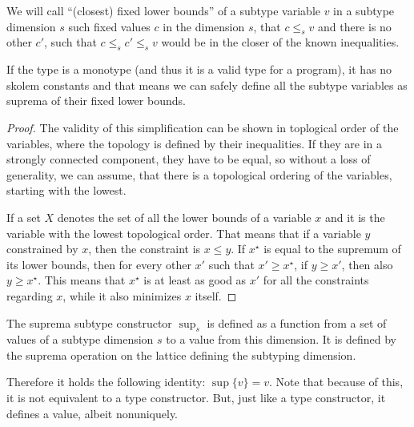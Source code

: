 \begin{defn}
    We will call ``(closest) fixed lower bounds'' of a subtype variable $v$ in a subtype dimension $s$ such fixed values $c$ in the dimension $s$, that $c \leq_s v$ and there is no other $c'$, such that $c \leq_s c' \leq_s v$ would be in the closer of the known inequalities.
\end{defn}

\begin{remark}
    If the type is a monotype (and thus it is a valid type for a program), it has no skolem constants and that means we can safely define all the subtype variables as suprema of their fixed lower bounds.
\end{remark}

\begin{lemma}
    \label{suprema_subtyping}
\end{lemma}

\begin{proof}
The validity of this simplification can be shown in toplogical order of the variables, where the topology is defined by their inequalities. If they are in a strongly connected component, they have to be equal, so without a loss of generality, we can assume, that there is a topological ordering of the variables, starting with the lowest.

If a set $X$ denotes the set of all the lower bounds of a variable $x$ and it is the variable with the lowest topological order. That means that if a variable $y$ constrained by $x$, then the constraint is $x \leq y$. If $x^\star$ is equal to the supremum of its lower bounds, then for every other $x'$ such that $x' \geq x^\star$, if $y \geq x'$, then also $y \geq x^\star$. This means that $x^\star$ is at least as good as $x'$ for all the constraints regarding $x$, while it also minimizes $x$ itself.
\end{proof}

\begin{defn}
    The suprema subtype constructor $\sup_s$ is defined as a function from a set of values of a subtype dimension $s$ to a value from this dimension. It is defined by the suprema operation on the lattice defining the subtyping dimension.

    Therefore it holds the following identity: $\sup \{v\} = v$. Note that because of this, it is not equivalent to a type constructor. But, just like a type constructor, it defines a value, albeit nonuniquely.
\end{defn}

